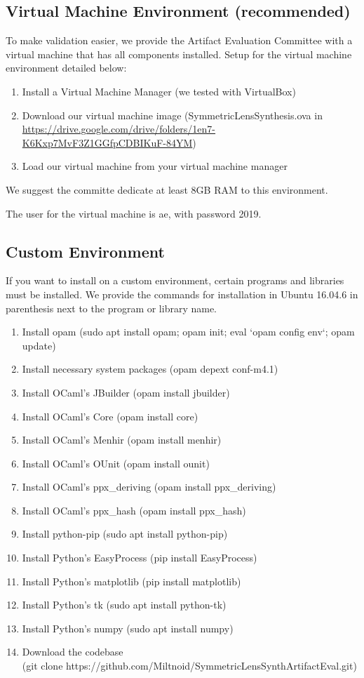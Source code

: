 \documentclass[sigplan,acmsmall]{acmart}
\begin{document}
\subsection{Virtual Machine Environment (recommended)}
To make validation easier, we provide the Artifact Evaluation Committee with a
virtual machine that has all components installed.  Setup for the virtual
machine environment detailed below:
\begin{enumerate}
\item Install a Virtual Machine Manager (we tested with VirtualBox)
\item Download our virtual machine image (SymmetricLensSynthesis.ova in\\
  {\color{blue}
    \url{https://drive.google.com/drive/folders/1en7-K6Kxp7MvF3Z1GGfpCDBIKuF-84YM})}
\item Load our virtual machine from your virtual machine manager
\end{enumerate}

We suggest the committe dedicate at least 8GB RAM to this environment.

The user for the virtual machine is ae, with password 2019.

\subsection{Custom Environment}
If you want to install on a custom environment, certain programs and libraries
must be installed.  We provide the commands for installation in Ubuntu 16.04.6
in parenthesis next to the program or library name.

\begin{enumerate}
\item Install opam (sudo apt install opam; opam init; eval `opam config env`;
  opam update)
\item Install necessary system packages (opam depext conf-m4.1)
\item Install OCaml's JBuilder (opam install jbuilder)
\item Install OCaml's Core (opam install core)
\item Install OCaml's Menhir (opam install menhir)
\item Install OCaml's OUnit (opam install ounit)
\item Install OCaml's ppx\_deriving (opam install ppx\_deriving)
\item Install OCaml's ppx\_hash (opam install ppx\_hash)
  
\item Install python-pip (sudo apt install python-pip)
\item Install Python's EasyProcess (pip install EasyProcess)
\item Install Python's matplotlib (pip install matplotlib)
\item Install Python's tk (sudo apt install python-tk)
\item Install Python's numpy (sudo apt install numpy)

\item Download the codebase\\
  (git clone https://github.com/Miltnoid/SymmetricLensSynthArtifactEval.git)
\end{enumerate}
\end{document}
